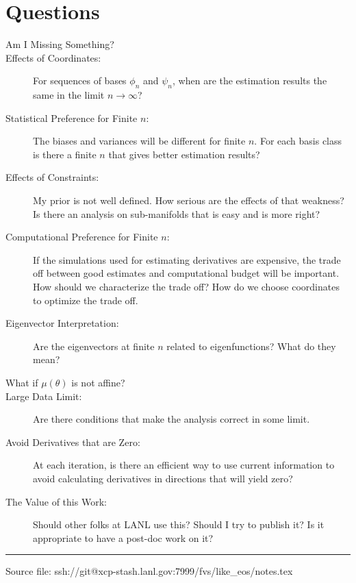\documentclass[11pt]{article}
\begin{document}


\section{Questions}
\label{sec:questions}

\begin{description}
\item[Am I Missing Something?] 
\item[Effects of Coordinates:] For sequences of bases $\phi_n$ and
  $\psi_n$, when are the estimation results the same in the limit
  $n \rightarrow \infty$?
\item[Statistical Preference for Finite $n$:] The biases and variances
  will be different for finite $n$.  For each basis class is there a
  finite $n$ that gives better estimation results?
\item[Effects of Constraints:] My prior is not well defined.  How
  serious are the effects of that weakness?  Is there an analysis on
  sub-manifolds that is easy and is more right?
\item[Computational Preference for Finite $n$:] If the simulations
  used for estimating derivatives are expensive, the trade off between
  good estimates and computational budget will be important.  How
  should we characterize the trade off?  How do we choose coordinates
  to optimize the trade off.
\item[Eigenvector Interpretation:] Are the eigenvectors at finite $n$
  related to eigenfunctions?  What do they mean?
\item[What if $\mu(\theta)$ is not affine?] 
\item[Large Data Limit:] Are there conditions that make the analysis
  correct in some limit.
\item[Avoid Derivatives that are Zero:] At each iteration, is there an
  efficient way to use current information to avoid calculating
  derivatives in directions that will yield zero?
\item[The Value of this Work:] Should other folks at LANL use this?
  Should I try to publish it?  Is it appropriate to have a post-doc
  work on it?
\end{description}
 
%
\vfill \hrule

Source file: ssh://git@xcp-stash.lanl.gov:7999/fvs/like\_eos/notes.tex
\end{document}

